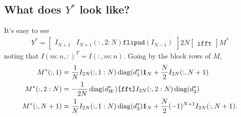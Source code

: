 \documentclass[letterpaper,12pt]{article}
\newcommand{\diag}{\operatorname{diag}}
\newcommand{\ones}{{\bf 1}}
\begin{document}
\subsection*{What does $Y^\ast$ look like?}

It's easy to see
\begin{align*}
 Y^\ast = 
  \begin{bmatrix} 
   I_{N+1} & I_{N+1}(:,2:N)\texttt{flipud}(I_{N-1})
  \end{bmatrix}
  2N\begin{bmatrix}\texttt{ifft}\end{bmatrix}
  M^\ast
\end{align*}
noting that $I(m:n,:)^T = I(:,m:n)$.
Going by the block rows of $M$, 
\begin{align*}
 M^\ast(:,1) &= \frac{1}{N}I_{2N}(:,1:N)\diag(d_1^\ast)\ones_N
              + \frac{N}{2}I_{2N}(:,N+1) \\ 
 M^\ast(:,2:N) &= -\frac{1}{2N}\diag(d_W^\ast)\texttt{[fft]}
                  I_{2N}(:,2:N)\diag(d_2^\ast) \\ 
 M^\ast(:,N+1) &= \frac{1}{N}I_{2N}(:,1:N)\diag(d_3^\ast)\ones_N
                + \frac{N}{2}(-1)^{N+1}I_{2N}(:,N+1).
\end{align*}
\end{document}
